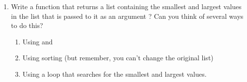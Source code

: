 \documentclass[letterpaper,10pt,english]{sphinxmanual}
\begin{document}
\begin{enumerate}
\begin{sphinxVerbatim}[commandchars=\\\{\}]
\end{sphinxVerbatim}

\item {} 
Write a function that returns a list containing the smallest and
largest values in the list that is passed to it as an argument
? Can you think of several ways to do
this?
\begin{enumerate}
\item {} 
Using  and 

\item {} 
Using sorting (but remember, you can’t change the original list)

\item {} 
Using a  loop that searches for the smallest and largest
values.

\end{enumerate}

\end{enumerate}
\end{document}
